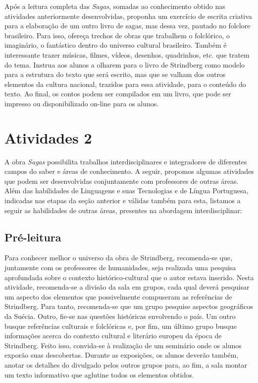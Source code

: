 \documentclass[12pt]{extarticle}
\begin{document}
Após a leitura completa das \emph{Sagas}, somadas ao
conhecimento obtido nas atividades anteriormente desenvolvidas, proponha
um exercício de escrita criativa para a elaboração de um outro livro de
sagas, mas dessa vez, pautado no folclore brasileiro. Para isso, ofereça
trechos de obras que trabalhem o folclórico, o imaginário, o fantástico
dentro do universo cultural brasileiro. Também é interessante trazer
músicas, filmes, vídeos, desenhos, quadrinhos, etc. que tratem do tema.
Instrua aos alunos a olharem para o livro de Strindberg como modelo para
a estrutura do texto que será escrito, mas que se valham dos outros
elementos da cultura nacional, trazidos para essa atividade, para o
conteúdo do texto. Ao final, os contos podem ser compilados em um livro,
que pode ser impresso ou disponibilizado on-line para os alunos.


\section{Atividades 2}


A obra \emph{Sagas} possibilita trabalhos interdisciplinares e
integradores de diferentes campos do saber e áreas de conhecimento. A
seguir, propomos algumas atividades que podem ser desenvolvidas
conjuntamente com professores de outras áreas. Além das habilidades de
Linguagens e suas Tecnologias e de Língua Portuguesa, indicadas nas
etapas da seção anterior e válidas também para esta, listamos a seguir
as habilidades de outras áreas, presentes na abordagem interdisciplinar:

\subsection{Pré-leitura}

Para conhecer melhor o universo da obra de Strindberg,
recomenda-se que, juntamente com os professores de humanidades, seja
realizada uma pesquisa aprofundada sobre o contexto histórico-cultural
que o autor estava inserido. Nesta atividade, recomenda-se a divisão da
sala em grupos, cada qual deverá pesquisar um aspecto dos elementos que
possivelmente compuseram as referências de Strindberg. Para tanto,
recomenda-se que um grupo pesquise aspectos geográficos da Suécia.
Outro, fie-se nas questões históricas envolvendo o país. Um outro busque
referências culturais e folclóricas e, por fim, um último grupo busque
informações acerca do contexto cultural e literário europeu da época de
Strindberg. Feito isso, convida-se à realização de um seminário onde os
alunos exporão suas descobertas. Durante as exposições, os alunos
deverão também, anotar os detalhes do divulgado pelos outros grupos
para, ao fim, a sala montar um texto informativo que aglutine todos os
elementos obtidos.
\end{document}
